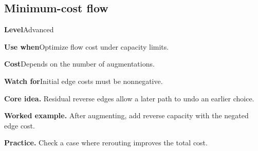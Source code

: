 \documentclass[10pt,letterpaper]{article}
\newcommand{\entrylabel}[1]{\textcolor{accent}{\bfseries #1}}
\begin{document}
\subsection{Minimum-cost flow}
\begin{guidebox}\small
\entrylabel{Level}\quad Advanced\par
\entrylabel{Use when}\quad Optimize flow cost under capacity limits.\par
\entrylabel{Cost}\quad Depends on the number of augmentations.\par
\entrylabel{Watch for}\quad Initial edge costs must be nonnegative.\par
\end{guidebox}
\noindent\textbf{Core idea.} Residual reverse edges allow a later path to undo an earlier choice.\par
\noindent\textbf{Worked example.} After augmenting, add reverse capacity with the negated edge cost.\par
\noindent\textbf{Practice.} Check a case where rerouting improves the total cost.\par
\end{document}
